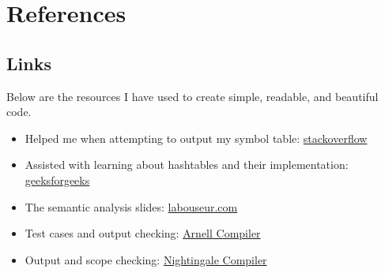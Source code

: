 \documentclass[letterpaper, 10pt,DIV=13]{scrartcl}
\numberwithin{equation}{section} %
\numberwithin{figure}{section} %
\numberwithin{table}{section} %
\begin{document}
\pagebreak

\section*{References}

\subsection*{Links}
Below are the resources I have used to create simple, readable, and beautiful code.

\begin{itemize}
    \item Helped me when attempting to output my symbol table: \href{https://stackoverflow.com/questions/20213022/get-all-the-values-from-a-hash-table}{stackoverflow}
    \item Assisted with learning about hashtables and their implementation: \href{https://www.geeksforgeeks.org/hashtable-in-java/}{geeksforgeeks}
    \item The semantic analysis slides: \href{https://www.labouseur.com/courses/compilers/semantic-analysis.pdf}{labouseur.com}
    \item Test cases and output checking: \href{https://www.labouseur.com/courses/compilers/compilers/arnell/dist/index.html}{Arnell Compiler}
    \item Output and scope checking: \href{https://alexbadia1.github.io/AxiOS-Compiler/#/}{Nightingale Compiler}
    
    
\end{itemize}

\pagebreak

% 
\end{document}
